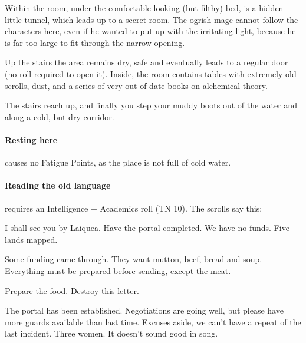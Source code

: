 \begin{multicols}{2}
Within the room, under the comfortable-looking (but filthy) bed, is a hidden little tunnel, which leads up to a secret room.
The ogrish mage cannot follow the characters here, even if he wanted to put up with the irritating light, because he is far too large to fit through the narrow opening.


Up the stairs the area remains dry, safe and eventually leads to a regular door (no roll required to open it).
Inside, the room contains tables with extremely old scrolls, dust, and a series of very out-of-date books on alchemical theory.

\begin{boxtext}

  The stairs reach up, and finally you step your muddy boots out of the water and along a cold, but dry corridor.

\end{boxtext}

\paragraph{Resting here}
causes no Fatigue Points, as the place is not full of cold water.

\paragraph{Reading the old language}
requires an Intelligence + Academics roll (TN 10).
The scrolls say this:

\begin{exampletext}

  I shall see you by Laiquea.  Have the portal completed.  We have no funds.  Five lands mapped.

\end{exampletext}

\begin{exampletext}

  Some funding came through.  They want mutton, beef, bread and soup.  Everything must be prepared before sending, except the meat.

  Prepare the food.  Destroy this letter.

\end{exampletext}

\begin{exampletext}

  The portal has been established.  Negotiations are going well, but please have more guards available than last time.  Excuses aside, we can't have a repeat of the last incident.  Three women.  It doesn't sound good in song.


\end{exampletext}
\end{multicols}
